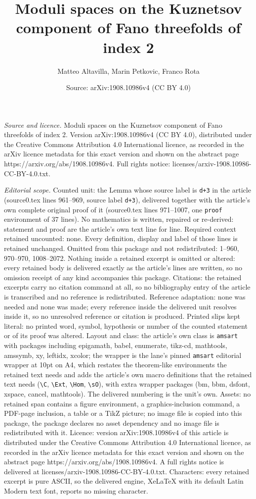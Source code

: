 \documentclass[10pt,a4paper]{amsart}
\title[Moduli spaces on the Kuznetsov component of Fano threefolds ]{Moduli spaces on the Kuznetsov component of Fano threefolds of index 2}
\author{Matteo Altavilla, Marin Petkovic, Franco Rota}
\date{Source: arXiv:1908.10986v4 (CC BY 4.0)}
\begin{document}
\maketitle

\noindent\emph{Source and licence.} Moduli spaces on the Kuznetsov component of Fano threefolds of index 2. Version arXiv:1908.10986v4 (CC BY 4.0), distributed under the Creative Commons Attribution 4.0 International licence, as recorded in the arXiv licence metadata for this exact version and shown on the abstract page https://arxiv.org/abs/1908.10986v4. Full rights notice: licenses/arxiv-1908.10986-CC-BY-4.0.txt.\par\smallskip

\noindent\textit{Editorial scope.} Counted unit: the Lemma whose source label is \texttt{d+3} in the article (source0.tex lines 961--969, source label \texttt{d+3}), delivered together with the article's own complete original proof of it (source0.tex lines 971--1007, one \texttt{proof} environment of 37 lines). No mathematics is written, repaired or re-derived: statement and proof are the article's own text line for line. Required context retained uncounted: none. Every definition, display and label of those lines is retained unchanged. Omitted from this package and not redistributed: 1--960, 970--970, 1008--2072. Nothing inside a retained excerpt is omitted or altered: every retained body is delivered exactly as the article's lines are written, so no omission receipt of any kind accompanies this package. Citations: the retained excerpts carry no citation command at all, so no bibliography entry of the article is transcribed and no reference is redistributed. Reference adaptation: none was needed and none was made; every reference inside the delivered unit resolves inside it, so no unresolved reference or citation is produced. Printed slips kept literal: no printed word, symbol, hypothesis or number of the counted statement or of its proof was altered. Layout and class: the article's own class is \texttt{amsart} with packages including epigamath, babel, enumerate, tikz-cd, mathtools, amssymb, xy, leftidx, xcolor; the wrapper is the lane's pinned \texttt{amsart} editorial wrapper at 10pt on A4, which restates the theorem-like environments the retained text needs and adds the article's own macro definitions that the retained text needs (\texttt{\textbackslash C}, \texttt{\textbackslash Ext}, \texttt{\textbackslash Hom}, \texttt{\textbackslash sO}), with extra wrapper packages (bm, bbm, dsfont, xspace, cancel, mathtools). The delivered numbering is the unit's own. Assets: no retained span contains a figure environment, a graphics-inclusion command, a PDF-page inclusion, a table or a TikZ picture; no image file is copied into this package, the package declares no asset dependency and no image file is redistributed with it. Licence: version arXiv:1908.10986v4 of this article is distributed under the Creative Commons Attribution 4.0 International licence, as recorded in the arXiv licence metadata for this exact version and shown on the abstract page https://arxiv.org/abs/1908.10986v4. A full rights notice is delivered at licenses/arxiv-1908.10986-CC-BY-4.0.txt. Characters: every retained excerpt is pure ASCII, so the delivered engine, XeLaTeX with its default Latin Modern text font, reports no missing character.
\end{document}
